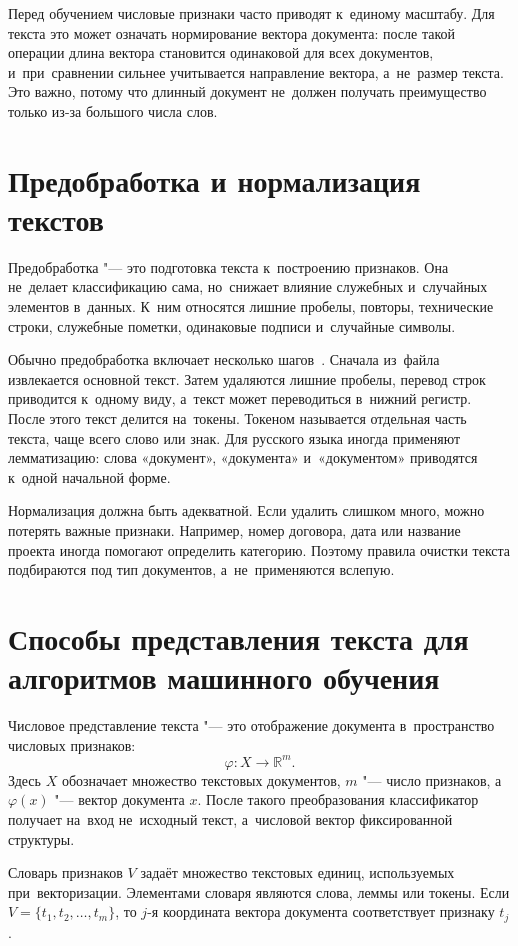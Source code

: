 Перед обучением числовые признаки часто приводят к~единому масштабу. Для текста
это может означать нормирование вектора документа: после такой операции длина
вектора становится одинаковой для всех документов, и~при~сравнении сильнее
учитывается направление вектора, а~не~размер текста. Это важно, потому что
длинный документ не~должен получать преимущество только из-за большого числа
слов.

\section{Предобработка и нормализация текстов}\label{sec:ch1/preprocess}

Предобработка "--- это подготовка текста к~построению признаков. Она не~делает
классификацию сама, но~снижает влияние служебных и~случайных элементов
в~данных. К~ним относятся лишние пробелы, повторы, технические строки,
служебные пометки, одинаковые подписи и~случайные символы.

Обычно предобработка включает несколько шагов~\autocite{Manning2008IR}. Сначала
из~файла извлекается основной текст. Затем удаляются лишние пробелы, перевод
строк приводится к~одному виду, а~текст может переводиться в~нижний регистр.
После этого текст делится на~токены. Токеном называется отдельная часть текста,
чаще всего слово или знак. Для русского языка иногда применяют лемматизацию:
слова «документ», «документа» и~«документом» приводятся к~одной начальной форме.

Нормализация должна быть адекватной. Если удалить слишком много, можно потерять
важные признаки. Например, номер договора, дата или название проекта иногда
помогают определить категорию. Поэтому правила очистки текста подбираются под
тип документов, а~не~применяются вслепую.

\section{Способы представления текста для алгоритмов машинного обучения}\label{sec:ch1/repr}

Числовое представление текста "--- это отображение документа
в~пространство числовых признаков:
\[
    \varphi: X \rightarrow \mathbb{R}^{m}.
\]
Здесь \( X \) обозначает множество текстовых документов, \( m \) "--- число
признаков, а~\( \varphi(x) \) "--- вектор документа \( x \). После такого
преобразования классификатор получает на~вход не~исходный текст, а~числовой
вектор фиксированной структуры.

Словарь признаков \( V \) задаёт множество текстовых единиц,
используемых при~векторизации. Элементами словаря являются слова, леммы или
токены. Если \( V = \{t_1, t_2, \ldots, t_m\} \), то \( j \)-я координата
вектора документа соответствует признаку \( t_j \).

